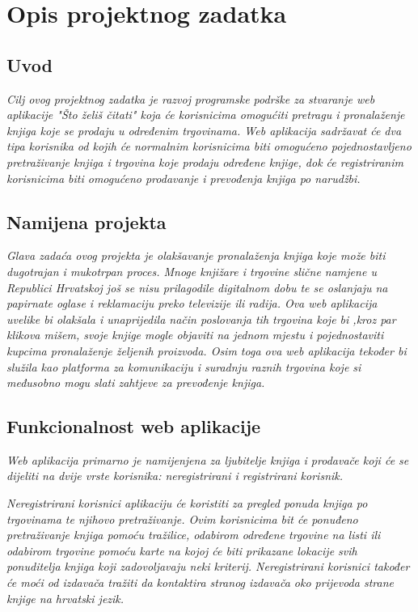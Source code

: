 \chapter{Opis projektnog zadatka}

	\section{Uvod}
	
		\textit{Cilj ovog projektnog zadatka je razvoj programske podrške za stvaranje web aplikacije "Što želiš čitati" koja će korisnicima omogućiti pretragu i pronalaženje knjiga koje se prodaju u određenim trgovinama. Web aplikacija sadržavat će dva tipa korisnika od kojih će normalnim korisnicima biti omogućeno pojednostavljeno pretraživanje knjiga i trgovina koje prodaju određene knjige, dok će registriranim korisnicima biti omogućeno prodavanje i prevođenja knjiga po narudžbi.}
		
	\section{Namijena projekta}
	
		\textit{Glava zadaća ovog projekta je olakšavanje pronalaženja knjiga koje može biti dugotrajan i mukotrpan proces. Mnoge knjižare i trgovine slične namjene u Republici Hrvatskoj još se nisu prilagodile digitalnom dobu te se oslanjaju na papirnate oglase i reklamaciju preko televizije ili radija. Ova web aplikacija uvelike bi olakšala i unaprijedila način poslovanja tih trgovina koje bi ,kroz par klikova mišem, svoje knjige mogle objaviti na jednom mjestu i pojednostaviti kupcima pronalaženje željenih proizvoda. Osim toga ova web aplikacija tekođer bi služila kao platforma za komunikaciju i suradnju raznih trgovina koje si međusobno mogu slati zahtjeve za prevođenje knjiga.}
		
	\section{Funkcionalnost web aplikacije}
	
	\textit{Web aplikacija primarno je namijenjena za ljubitelje knjiga i prodavače koji će se dijeliti na dvije vrste korisnika: neregistrirani i registrirani korisnik.}
	
	\textit{Neregistrirani korisnici aplikaciju će koristiti za pregled ponuda knjiga po trgovinama te njihovo pretraživanje. Ovim korisnicima bit će ponuđeno pretraživanje knjiga pomoću tražilice, odabirom određene trgovine na listi ili odabirom trgovine pomoću karte na kojoj će biti prikazane lokacije svih ponuditelja knjiga koji zadovoljavaju neki kriterij. Neregistrirani korisnici također će moći od izdavača tražiti da kontaktira stranog izdavača oko prijevoda strane knjige na hrvatski jezik.}
	
